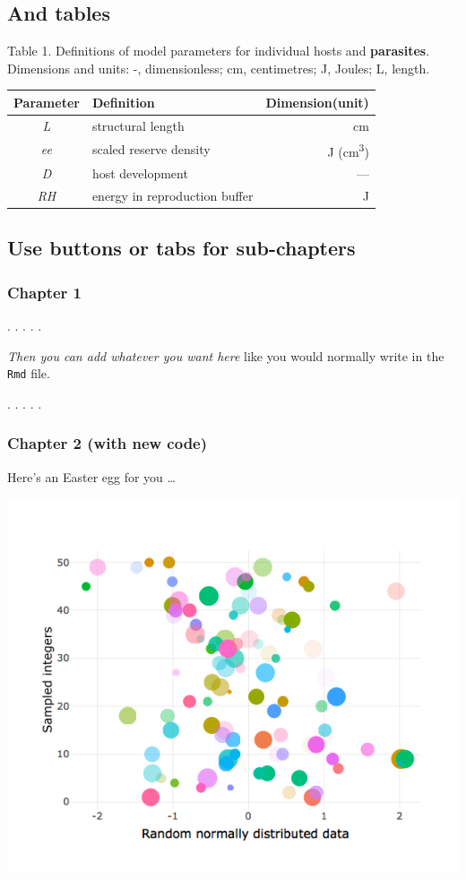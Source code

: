 \documentclass[article]{article}
\begin{document}
\newpage

\subsection{And tables}\label{and-tables}

Table 1. Definitions of model parameters for individual hosts and
\textbf{parasites}. Dimensions and units: -, dimensionless; cm,
centimetres; J, Joules; L, length.

\begin{longtable}[]{@{}clr@{}}
\toprule
Parameter & Definition & Dimension(unit)\tabularnewline
\midrule
\endhead
\emph{L} & structural length & cm\tabularnewline
\emph{ee} & scaled reserve density & J
(cm\textsuperscript{3})\tabularnewline
\emph{D} & host development & ---\tabularnewline
\emph{RH} & energy in reproduction buffer & J\tabularnewline
\bottomrule
\end{longtable}

\newpage

\subsection{Use buttons or tabs for
sub-chapters}\label{use-buttons-or-tabs-for-sub-chapters}

\subsubsection{Chapter 1}\label{chapter-1}

. . . . .

\emph{Then you can add whatever you want here} like you would normally
write in the \texttt{Rmd} file.

. . . . .

\subsubsection{Chapter 2 (with new code)}\label{chapter-2-with-new-code}

Here's an Easter egg for you \ldots{}

\includegraphics{Lesson5_rmd_files/figure-docx/unnamed-chunk-4-1.png}
\end{document}
